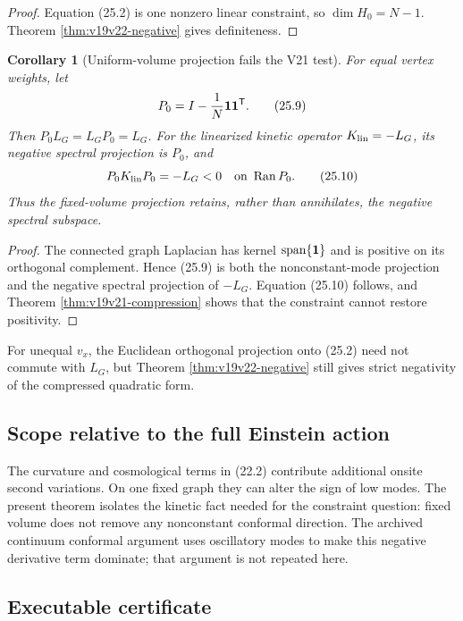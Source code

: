 \documentclass[11pt]{article}
\newtheorem{corollary}[theorem]{Corollary}
\theoremstyle{remark}
\begin{document}
\begin{proof}
Equation (25.2) is one nonzero linear constraint, so
\(\dim H_0=N-1\).  Theorem \ref{thm:v19v22-negative} gives definiteness.
\end{proof}

\begin{corollary}[Uniform-volume projection fails the V21 test]
\label{cor:v19v22-projection}
For equal vertex weights, let
\[
 P_0=I-\frac1N{\bf1}{\bf1}^{\mathsf T}.                        \tag{25.9}
\]
Then \(P_0L_G=L_GP_0=L_G\).  For the linearized kinetic operator
\(K_{\rm lin}=-L_G\), its negative spectral projection is \(P_0\), and
\[
 P_0K_{\rm lin}P_0=-L_G<0\quad\hbox{on }\operatorname{Ran}P_0. \tag{25.10}
\]
Thus the fixed-volume projection retains, rather than annihilates, the
negative spectral subspace.
\end{corollary}

\begin{proof}
The connected graph Laplacian has kernel
\(\operatorname{span}\{{\bf1}\}\) and is positive on its orthogonal
complement.  Hence (25.9) is both the nonconstant-mode projection and the
negative spectral projection of \(-L_G\).  Equation (25.10) follows, and
Theorem \ref{thm:v19v21-compression} shows that the constraint cannot
restore positivity.
\end{proof}

For unequal \(v_x\), the Euclidean orthogonal projection onto (25.2) need
not commute with \(L_G\), but Theorem \ref{thm:v19v22-negative} still gives
strict negativity of the compressed quadratic form.

\subsection{Scope relative to the full Einstein action}

The curvature and cosmological terms in (22.2) contribute additional
onsite second variations.  On one fixed graph they can alter the sign of
low modes.  The present theorem isolates the kinetic fact needed for the
constraint question: fixed volume does not remove any nonconstant
conformal direction.  The archived continuum conformal argument uses
oscillatory modes to make this negative derivative term dominate; that
argument is not repeated here.

\subsection{Executable certificate}
\end{document}
